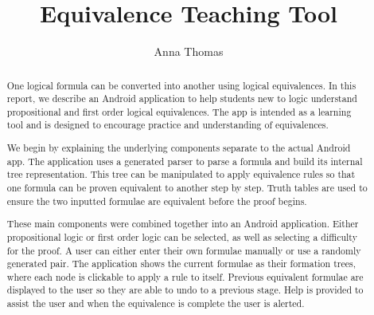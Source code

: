 \documentclass{report}
\begin{document}
\expandafter\def\csname PY@tok@err\endcsname{}

\title{Equivalence Teaching Tool}
\author{Anna Thomas}

\maketitle


\begin{abstract}
One logical formula can be converted into another using logical equivalences. In this report, we describe an Android application to help students new to logic understand propositional and first order logical equivalences. The app is intended as a learning tool and is designed to encourage practice and understanding of equivalences.

We begin by explaining the underlying components separate to the actual Android app. The application uses a generated parser to parse a formula and build its internal tree representation. This tree can be manipulated to apply equivalence rules so that one formula can be proven equivalent to another step by step. Truth tables are used to ensure the two inputted formulae are equivalent before the proof begins.

These main components were combined together into an Android application. Either propositional logic or first order logic can be selected, as well as selecting a difficulty for the proof. A user can either enter their own formulae manually or use a randomly generated pair. The application shows the current formulae as their formation trees, where each node is clickable to apply a rule to itself. Previous equivalent formulae are displayed to the user so they are able to undo to a previous stage. Help is provided to assist the user and when the equivalence is complete the user is alerted.

\end{abstract}
\end{document}
